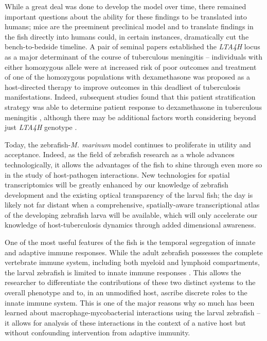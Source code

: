 While a great deal was done to develop the model over time, there remained important questions about the ability for these findings to be translated into humans; mice are the preeminent preclinical model and to translate findings in the fish directly into humans could, in certain instances, dramatically cut the bench-to-bedside timeline. A pair of seminal papers \citep{Tobin2010, Tobin2012} established the \textit{LTA4H} locus as a major determinant of the course of tuberculous meningitis -- individuals with either homozygous allele were at increased risk of poor outcomes and treatment of one of the homozygous populations with dexamethasone was proposed as a host-directed therapy to improve outcomes in this deadliest of tuberculosis manifestations. Indeed, subsequent studies found that this patient stratification strategy was able to determine patient response to dexamethasone in tuberculous meningitis \citep{Thuong2017, Thwaites2017, Davis2018, Prasad2016}, although there may be additional factors worth considering beyond just \textit{LTA4H} genotype \citep{Siddiqi2021}.

Today, the zebrafish-\textit{M. marinum} model continues to proliferate in utility and acceptance. Indeed, as the field of zebrafish research as a whole advances technologically, it allows the advantages of the fish to shine through even more so in the study of host-pathogen interactions. New technologies for spatial transcriptomics will be greatly enhanced by our knowledge of zebrafish development and the existing optical transparency of the larval fish; the day is likely not far distant when a comprehensive, spatially-aware transcriptional atlas of the developing zebrafish larva will be available, which will only accelerate our knowledge of host-tuberculosis dynamics through added dimensional awareness.

One of the most useful features of the fish is the temporal segregation of innate and adaptive immune responses. While the adult zebrafish possesses the complete vertebrate immune system, including both myeloid and lymphoid compartments, the larval zebrafish is limited to innate immune responses \citep{Cronan2014}. This allows the researcher to differentiate the contributions of these two distinct systems to the overall phenotype and to, in an unmodified host, ascribe discrete roles to the innate immune system. This is one of the major reasons why so much has been learned about macrophage-mycobacterial interactions using the larval zebrafish -- it allows for analysis of these interactions in the context of a native host but without confounding intervention from adaptive immunity.

